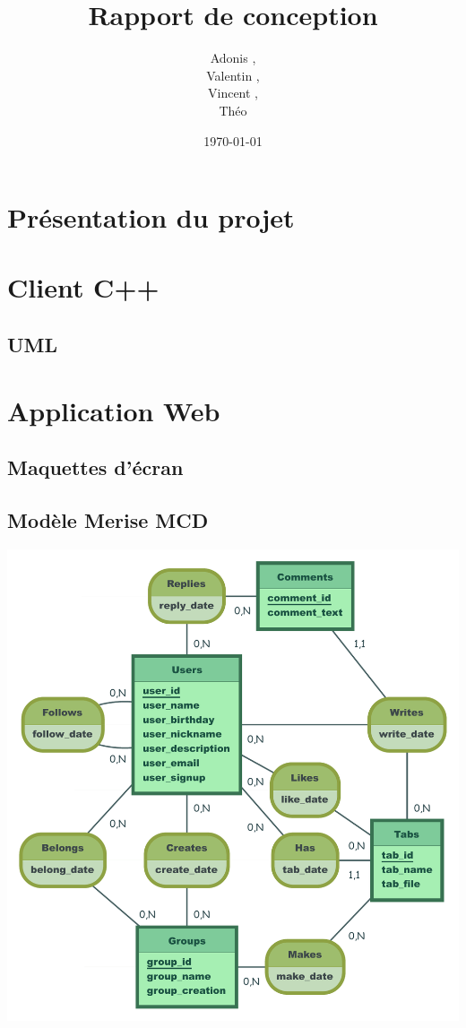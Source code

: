 \documentclass[a4paper]{article}
\title{Rapport de conception}
\author{Adonis \bsc{Najimi},\\
 Valentin \bsc{Stern},\\
 Vincent \bsc{Albert},\\
 Théo \bsc{Gerriet}}
\date{\today}
\begin{document}
\maketitle
\section{Présentation du projet}
\section{Client C++}
\subsection{UML}
\section{Application Web}
\subsection{Maquettes d'écran}
\subsection{Modèle Merise MCD}
\centerline{\includegraphics[scale=0.8]{MCD_MLD_Music}}
\end{document}
